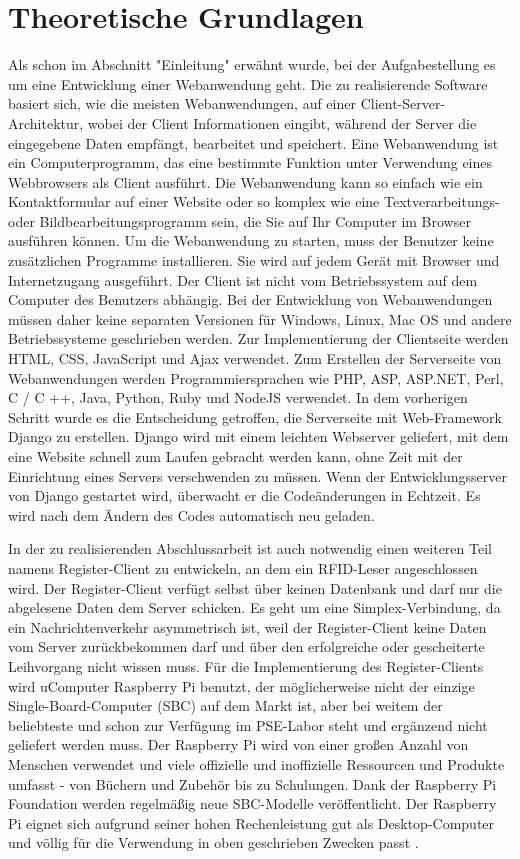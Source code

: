 \chapter{Theoretische Grundlagen}
\label{sec:theorie}
Als schon im Abschnitt "Einleitung" erwähnt wurde, bei der Aufgabestellung es um eine Entwicklung einer Webanwendung geht. Die zu realisierende Software basiert sich, wie die meisten Webanwendungen, auf einer Client-Server-Architektur, wobei der Client Informationen eingibt, während der Server die eingegebene Daten empfängt, bearbeitet und speichert. Eine Webanwendung ist ein Computerprogramm, das eine bestimmte Funktion unter Verwendung eines Webbrowsers als Client ausführt. Die Webanwendung kann so einfach wie ein Kontaktformular auf einer Website oder so komplex wie eine Textverarbeitungs- oder Bildbearbeitungsprogramm sein, die Sie auf Ihr Computer im Browser ausführen können. Um die Webanwendung zu starten, muss der Benutzer keine zusätzlichen Programme installieren. Sie wird auf jedem Gerät mit Browser und Internetzugang ausgeführt. Der Client ist nicht vom Betriebssystem auf dem Computer des Benutzers abhängig. Bei der Entwicklung von Webanwendungen müssen daher keine separaten Versionen für Windows, Linux, Mac OS und andere Betriebssysteme geschrieben werden. Zur Implementierung der Clientseite werden HTML, CSS, JavaScript und Ajax verwendet. Zum Erstellen der Serverseite von Webanwendungen werden Programmiersprachen wie PHP, ASP, ASP.NET, Perl, C / C ++, Java, Python, Ruby und NodeJS verwendet. In dem vorherigen Schritt wurde es die Entscheidung getroffen, die Serverseite mit Web-Framework Django zu erstellen. Django wird mit einem leichten Webserver geliefert, mit dem eine  Website schnell zum Laufen gebracht werden kann, ohne Zeit mit der Einrichtung eines Servers verschwenden zu müssen. Wenn der Entwicklungsserver von Django gestartet wird, überwacht er die Codeänderungen in Echtzeit. Es wird nach dem Ändern des Codes automatisch neu geladen.

In der zu realisierenden Abschlussarbeit ist auch notwendig einen weiteren Teil namens Register-Client zu entwickeln, an dem ein RFID-Leser angeschlossen wird. Der Register-Client verfügt selbst über keinen Datenbank und darf nur die abgelesene Daten dem Server schicken. Es geht um eine Simplex-Verbindung, da ein Nachrichtenverkehr asymmetrisch ist, weil der Register-Client keine Daten vom Server zurückbekommen darf und über den erfolgreiche oder gescheiterte Leihvorgang nicht wissen muss. Für die Implementierung des Register-Clients wird uComputer Raspberry Pi benutzt, der möglicherweise nicht der einzige Single-Board-Computer (SBC) auf dem Markt ist, aber bei weitem der beliebteste und schon zur Verfügung im PSE-Labor steht und ergänzend nicht geliefert werden muss. Der Raspberry Pi wird von einer großen Anzahl von Menschen verwendet und viele offizielle und inoffizielle Ressourcen und Produkte umfasst - von Büchern und Zubehör bis zu Schulungen. Dank der Raspberry Pi Foundation werden regelmäßig neue SBC-Modelle veröffentlicht. Der Raspberry Pi eignet sich aufgrund seiner hohen Rechenleistung gut als Desktop-Computer und völlig für die Verwendung in oben geschrieben Zwecken passt . 

